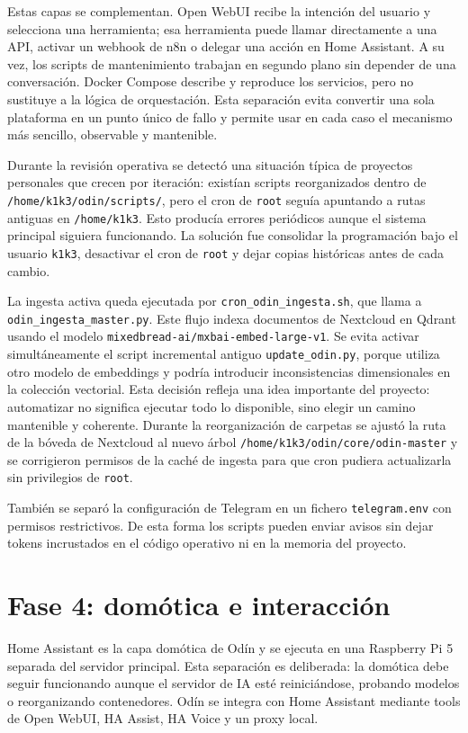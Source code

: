 Estas capas se complementan. Open WebUI recibe la intención del usuario y selecciona una herramienta; esa herramienta puede llamar directamente a una API, activar un webhook de n8n o delegar una acción en Home Assistant. A su vez, los scripts de mantenimiento trabajan en segundo plano sin depender de una conversación. Docker Compose describe y reproduce los servicios, pero no sustituye a la lógica de orquestación. Esta separación evita convertir una sola plataforma en un punto único de fallo y permite usar en cada caso el mecanismo más sencillo, observable y mantenible.

Durante la revisión operativa se detectó una situación típica de proyectos personales que crecen por iteración: existían scripts reorganizados dentro de \nolinkurl{/home/k1k3/odin/scripts/}, pero el cron de \texttt{root} seguía apuntando a rutas antiguas en \nolinkurl{/home/k1k3}. Esto producía errores periódicos aunque el sistema principal siguiera funcionando. La solución fue consolidar la programación bajo el usuario \texttt{k1k3}, desactivar el cron de \texttt{root} y dejar copias históricas antes de cada cambio.

La ingesta activa queda ejecutada por \nolinkurl{cron_odin_ingesta.sh}, que llama a \nolinkurl{odin_ingesta_master.py}. Este flujo indexa documentos de Nextcloud en Qdrant usando el modelo \nolinkurl{mixedbread-ai/mxbai-embed-large-v1}. Se evita activar simultáneamente el script incremental antiguo \nolinkurl{update_odin.py}, porque utiliza otro modelo de embeddings y podría introducir inconsistencias dimensionales en la colección vectorial. Esta decisión refleja una idea importante del proyecto: automatizar no significa ejecutar todo lo disponible, sino elegir un camino mantenible y coherente. Durante la reorganización de carpetas se ajustó la ruta de la bóveda de Nextcloud al nuevo árbol \nolinkurl{/home/k1k3/odin/core/odin-master} y se corrigieron permisos de la caché de ingesta para que cron pudiera actualizarla sin privilegios de \texttt{root}.

También se separó la configuración de Telegram en un fichero \texttt{telegram.env} con permisos restrictivos. De esta forma los scripts pueden enviar avisos sin dejar tokens incrustados en el código operativo ni en la memoria del proyecto.

\section{Fase 4: domótica e interacción}
Home Assistant es la capa domótica de Odín y se ejecuta en una Raspberry Pi 5 separada del servidor principal. Esta separación es deliberada: la domótica debe seguir funcionando aunque el servidor de IA esté reiniciándose, probando modelos o reorganizando contenedores. Odín se integra con Home Assistant mediante tools de Open WebUI, HA Assist, HA Voice y un proxy local.

